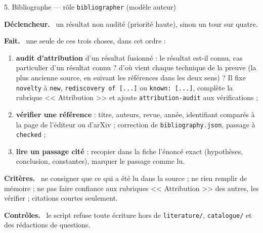 \documentclass[11pt,a4paper]{article}
\newcommand{\cmd}[1]{\texttt{#1}}
\newcommand{\rub}[1]{\par\smallskip\textsf{\textbf{#1.}}~}
\begin{document}
\begin{tache}{5. Bibliographe --- rôle \cmd{bibliographer} (modèle auteur)}
\rub{Déclencheur} un résultat non audité (priorité haute), sinon un tour sur quatre.
\rub{Fait} une seule de ces trois choses, dans cet ordre :
\begin{enumerate}
\item \textbf{audit d'attribution} d'un résultat fusionné : le résultat est-il connu, cas particulier
  d'un résultat connu ? d'où vient chaque technique de la preuve (la plus ancienne source, en suivant les
  références dans les deux sens) ? Il fixe \cmd{novelty} à \cmd{new}, \cmd{rediscovery of [...]} ou
  \cmd{known: [...]}, complète la rubrique << Attribution >> et ajoute \cmd{attribution-audit} aux
  vérifications ;
\item \textbf{vérifier une référence} : titre, auteurs, revue, année, identifiant comparés à la page de
  l'éditeur ou d'arXiv ; correction de \cmd{bibliography.json}, passage à \cmd{checked} ;
\item \textbf{lire un passage cité} : recopier dans la fiche l'énoncé exact (hypothèses, conclusion,
  constantes), marquer le passage comme lu.
\end{enumerate}
\rub{Critères} ne consigner que ce qui a été lu dans la source ; ne rien remplir de mémoire ; ne pas
faire confiance aux rubriques << Attribution >> des autres, les vérifier ; citations courtes seulement.
\rub{Contrôles} le script refuse toute écriture hors de \cmd{literature/}, \cmd{catalogue/} et des
rédactions de questions.
\end{tache}
\end{document}
